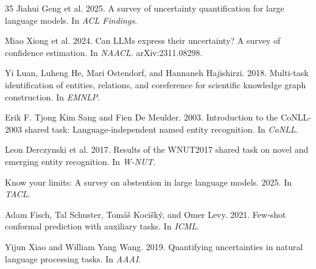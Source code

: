\documentclass[11pt,a4paper]{article}
\begin{document}
\begin{thebibliography}{35}
Jiahui Geng et al. 2025.
A survey of uncertainty quantification for large language models.
In \emph{ACL Findings}.

Miao Xiong et al. 2024.
Can LLMs express their uncertainty? A survey of confidence estimation.
In \emph{NAACL}. arXiv:2311.08298.

Yi Luan, Luheng He, Mari Ostendorf, and Hannaneh Hajishirzi. 2018.
Multi-task identification of entities, relations, and coreference for scientific knowledge graph construction.
In \emph{EMNLP}.

Erik F. Tjong Kim Sang and Fien De Meulder. 2003.
Introduction to the CoNLL-2003 shared task: Language-independent named entity recognition.
In \emph{CoNLL}.

Leon Derczynski et al. 2017.
Results of the WNUT2017 shared task on novel and emerging entity recognition.
In \emph{W-NUT}.

Know your limits: A survey on abstention in large language models. 2025.
In \emph{TACL}.

Adam Fisch, Tal Schuster, Tom{\'a}{\v{s}} Koci{\v{s}}k{\'y}, and Omer Levy. 2021.
Few-shot conformal prediction with auxiliary tasks.
In \emph{ICML}.

Yijun Xiao and William Yang Wang. 2019.
Quantifying uncertainties in natural language processing tasks.
In \emph{AAAI}.

\end{thebibliography}
\end{document}

